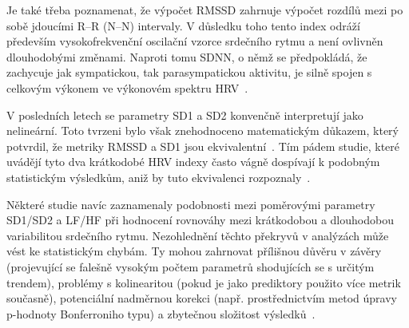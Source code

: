 Je také třeba poznamenat, že výpočet RMSSD zahrnuje výpočet rozdílů mezi po sobě
jdoucími R--R (N--N) intervaly. V důsledku toho tento index odráží především
vysokofrekvenční oscilační vzorce srdečního rytmu a není ovlivněn dlouhodobými
změnami. Naproti tomu SDNN, o němž se předpokládá, že zachycuje jak sympatickou,
tak parasympatickou aktivitu, je silně spojen s celkovým výkonem ve výkonovém
spektru \gls{HRV}~\cite{Bigger1989,Malik1996,Ishaque2021,Acharya2006}.

V posledních letech se parametry SD1 a SD2 konvenčně interpretují jako
nelineární. Toto tvrzeni bylo však znehodnoceno matematickým důkazem, který
potvrdil, že metriky RMSSD a SD1 jsou ekvivalentní~\cite{Ciccone2017}. Tím pádem
studie, které uvádějí tyto dva krátkodobé \gls{HRV} indexy často vágně dospívají
k podobným statistickým výsledkům, aniž by tuto ekvivalenci
rozpoznaly~\cite{Tam2021,Leite2015,Rohila2020,Peng2015}.

Některé studie navíc zaznamenaly podobnosti mezi poměrovými parametry SD1/SD2 a
LF/HF při hodnocení rovnováhy mezi krátkodobou a dlouhodobou variabilitou
srdečního rytmu. Nezohlednění těchto překryvů v analýzách může vést ke
statistickým chybám. Ty mohou zahrnovat přílišnou důvěru v závěry (projevující
se falešně vysokým počtem parametrů shodujících se s určitým trendem), problémy
s kolinearitou (pokud je jako prediktory použito více metrik současně),
potenciální nadměrnou korekci (např. prostřednictvím metod úpravy p-hodnoty
Bonferroniho typu) a zbytečnou složitost
výsledků~\cite{Tam2021,Rohila2020,Dormman2013,Guzik2013,Brennan2002}.
